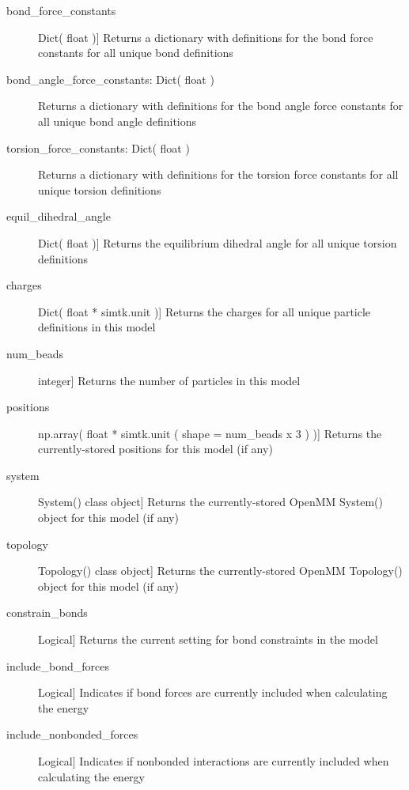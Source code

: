 \documentclass[letterpaper,12pt,english,openany,oneside]{sphinxmanual}
\begin{document}
\begin{fulllineitems}
\begin{description}
\item[{bond\_force\_constants}] \leavevmode{[}Dict( float ){]}
Returns a dictionary with definitions for the bond force constants for all unique bond definitions

\item[{bond\_angle\_force\_constants: Dict( float )}] \leavevmode
Returns a dictionary with definitions for the bond angle force constants for all unique bond angle definitions

\item[{torsion\_force\_constants: Dict( float )}] \leavevmode
Returns a dictionary with definitions for the torsion force constants for all unique torsion definitions

\item[{equil\_dihedral\_angle}] \leavevmode{[}Dict( float ){]}
Returns the equilibrium dihedral angle for all unique torsion definitions

\item[{charges}] \leavevmode{[}Dict( float * simtk.unit ){]}
Returns the charges for all unique particle definitions in this model

\item[{num\_beads}] \leavevmode{[}integer{]}
Returns the number of particles in this model

\item[{positions}] \leavevmode{[}np.array( float * simtk.unit ( shape = num\_beads x 3 ) ){]}
Returns the currently-stored positions for this model (if any)

\item[{system}] \leavevmode{[}System() class object{]}
Returns the currently-stored OpenMM System() object for this model (if any)

\item[{topology}] \leavevmode{[}Topology() class object{]}
Returns the currently-stored OpenMM Topology() object for this model (if any)

\item[{constrain\_bonds}] \leavevmode{[}Logical{]}
Returns the current setting for bond constraints in the model

\item[{include\_bond\_forces}] \leavevmode{[}Logical{]}
Indicates if bond forces are currently included when calculating the energy

\item[{include\_nonbonded\_forces}] \leavevmode{[}Logical{]}
Indicates if nonbonded interactions are currently included when calculating the energy


\end{description}
\end{fulllineitems}
\end{document}
